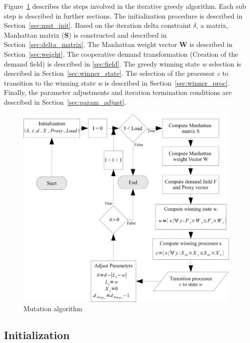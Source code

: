 Figure~\ref{fig:mutation_algo} describes the steps involved in the iterative greedy algorithm. 
Each sub step is described in further sections. The initialization procedure is described in Section~\ref{sec:mut_init}.
Based on the iteration delta constraint $\delta$, a matrix, Manhattan
matrix (\textbf{S}) is constructed and described in Section~\ref{sec:delta_matrix}.
The Manhattan weight vector \textbf{W} is described in Section~\ref{sec:weight}.
The cooperative demand transformation (Creation of the demand field) is described in
\ref{sec:field}. The greedy winning state \textit{w} selection is described in Section~\ref{sec:winner_state}.
The selection of the processor \textit{c} to transition to the winning state \textit{w} 
is described in Section~\ref{sec:winner_proc}. Finally, the parameter adjustments and iteration
termination conditions are described in Section~\ref{sec:param_adjust}. 

\begin{figure}[h!]
  \begin{center}
    \includegraphics[height=4in]{figures/Mutation_algo.jpg}
    \caption{Mutation algorithm}
    \label{fig:mutation_algo}
  \end{center}
\end{figure}

\subsection{Initialization}~\label{sec:mut_init}


